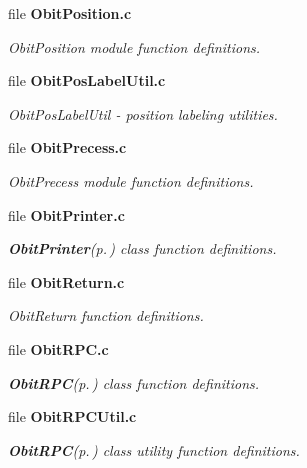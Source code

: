 \begin{CompactItemize}
\item 
file {\bf Obit\-Position.c}
\begin{CompactList}\small\item\em Obit\-Position module function definitions. \item\end{CompactList}

\item 
file {\bf Obit\-Pos\-Label\-Util.c}
\begin{CompactList}\small\item\em Obit\-Pos\-Label\-Util - position labeling utilities. \item\end{CompactList}

\item 
file {\bf Obit\-Precess.c}
\begin{CompactList}\small\item\em Obit\-Precess module function definitions. \item\end{CompactList}

\item 
file {\bf Obit\-Printer.c}
\begin{CompactList}\small\item\em {\bf Obit\-Printer}{\rm (p.\,\pageref{structObitPrinter})} class function definitions. \item\end{CompactList}

\item 
file {\bf Obit\-Return.c}
\begin{CompactList}\small\item\em Obit\-Return function definitions. \item\end{CompactList}

\item 
file {\bf Obit\-RPC.c}
\begin{CompactList}\small\item\em {\bf Obit\-RPC}{\rm (p.\,\pageref{structObitRPC})} class function definitions. \item\end{CompactList}

\item 
file {\bf Obit\-RPCUtil.c}
\begin{CompactList}\small\item\em {\bf Obit\-RPC}{\rm (p.\,\pageref{structObitRPC})} class utility function definitions. \item\end{CompactList}


\end{CompactItemize}
